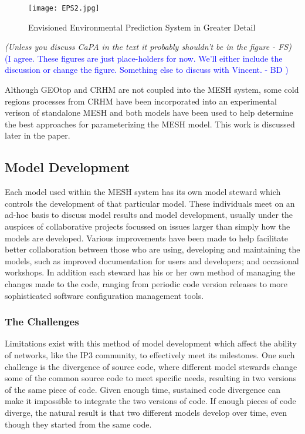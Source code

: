 \documentclass[hess]{copernicus}
\begin{document}
\begin{figure}[h!]
\vspace*{2mm}
\begin{center}
\texttt{[image: EPS2.jpg]}
\end{center}
\caption{Envisioned Environmental Prediction System in Greater Detail}
\label{eps2}
\end{figure}

{\em (Unless you discuss CaPA in the text it probably shouldn't be in the figure - FS)}\textcolor{blue}{ (I agree. These figures are just place-holders for now. We'll either include the discussion or change the figure. Something else to discuss with Vincent. - BD )}

Although GEOtop and CRHM are not coupled into the MESH system, some cold regions processes from CRHM have been incorporated into an experimental verison of standalone MESH and both models have been used to help determine the best approaches for parameterizing the MESH model. This work is discussed later in the paper.

\subsection{Model Development}
Each model used within the MESH system has its own model steward which controls the development of that particular model. These individuals meet on an ad-hoc basis to discuss model results and model development, usually under the auspices of collaborative projects focussed on issues larger than simply how the models are developed. Various improvements have been made to help facilitate better collaboration between those who are using, developing and maintaining the models, such as improved documentation for users and developers; and occasional workshops. In addition each steward has his or her own method of managing the changes made to the code, ranging from periodic code version releases to more sophisticated software configuration management tools.

\subsubsection{The Challenges}
Limitations exist with this method of model development which affect the ability of networks, like the IP3 community, to effectively meet its milestones. One such challenge is the divergence of source code, where different model stewards change some of the common source code to meet specific needs, resulting in two versions of the same piece of code. Given enough time, sustained code divergence can make it impossible to integrate the two versions of code. If enough pieces of code diverge, the natural result is that two different models develop over time, even though they started from the same code.
\end{document}
